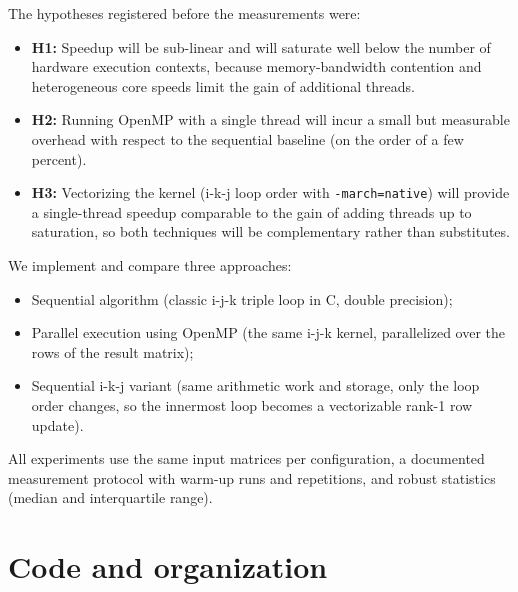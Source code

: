 \documentclass[12pt,a4paper]{article}
\begin{document}
The hypotheses registered before the measurements were:
\begin{itemize}
\item \textbf{H1:} Speedup will be sub-linear and will saturate well below
the number of hardware execution contexts, because memory-bandwidth
contention and heterogeneous core speeds limit the gain of additional
threads.
\item \textbf{H2:} Running OpenMP with a single thread will incur a small
but measurable overhead with respect to the sequential baseline (on the
order of a few percent).
\item \textbf{H3:} Vectorizing the kernel (i-k-j loop order with
\texttt{-march=native}) will provide a single-thread speedup comparable to
the gain of adding threads up to saturation, so both techniques will be
complementary rather than substitutes.
\end{itemize}

We implement and compare three approaches:
\begin{itemize}
\item Sequential algorithm (classic i-j-k triple loop in C, double
precision);
\item Parallel execution using OpenMP (the same i-j-k kernel, parallelized
over the rows of the result matrix);
\item Sequential i-k-j variant (same arithmetic work and storage, only the
loop order changes, so the innermost loop becomes a vectorizable rank-1
row update).
\end{itemize}

All experiments use the same input matrices per configuration, a documented
measurement protocol with warm-up runs and repetitions, and robust
statistics (median and interquartile range).

\section{Code and organization}
\label{sec:code}
\end{document}
